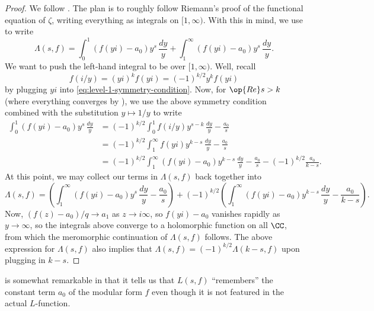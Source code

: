 \documentclass{amsart}
\begin{document}
\begin{proof}
	We follow \cite[Theorem~9.5]{conrad-forms}. The plan is to roughly follow Riemann's proof of the functional equation of $\zeta$, writing everything as integrals on $[1,\infty)$. With this in mind, we use  to write
	\[\Lambda(s,f)=\int_0^1(f(yi)-a_0)y^s\,\frac{dy}y+\int_1^\infty(f(yi)-a_0)y^s\,\frac{dy}y.\]
	We want to push the left-hand integral to be over $[1,\infty)$. Well, recall
	\[f(i/y)=(yi)^kf(yi)=(-1)^{k/2}y^kf(yi)\]
	by plugging $yi$ into \eqref{eq:level-1-symmetry-condition}. Now, for $\op{Re}s>k$ (where everything converges by ), we use the above symmetry condition combined with the substitution $y\mapsto1/y$ to write
	\begin{align*}
		\int_0^1(f(yi)-a_0)y^s\,\frac{dy}y &= (-1)^{k/2}\int_0^1f(i/y)y^{s-k}\,\frac{dy}y-\frac{a_0}s \\
		&= (-1)^{k/2}\int_1^\infty f(yi)y^{k-s}\,\frac{dy}y-\frac{a_0}s \\
		&= (-1)^{k/2}\int_1^\infty(f(yi)-a_0)y^{k-s}\,\frac{dy}y-\frac{a_0}s-(-1)^{k/2}\frac{a_0}{k-s}.
	\end{align*}
	At this point, we may collect our terms in $\Lambda(s,f)$ back together into
	\[\Lambda(s,f)=\left(\int_1^\infty(f(yi)-a_0)y^s\,\frac{dy}y-\frac{a_0}s\right)+(-1)^{k/2}\left(\int_1^\infty(f(yi)-a_0)y^{k-s}\,\frac{dy}y-\frac{a_0}{k-s}\right).\]
	Now, $(f(z)-a_0)/q\to a_1$ as $z\to i\infty$, so $f(yi)-a_0$ vanishes rapidly as $y\to\infty$, so the integrals above converge to a holomorphic function on all $\CC$, from which the meromorphic continuation of $\Lambda(s,f)$ follows. The above expression for $\Lambda(s,f)$ also implies that $\Lambda(s,f)=(-1)^{k/2}\Lambda(k-s,f)$ upon plugging in $k-s$.
\end{proof}
\begin{remark}
	 is somewhat remarkable in that it tells us that $L(s,f)$ ``remembers'' the constant term $a_0$ of the modular form $f$ even though it is not featured in the actual $L$-function.
\end{remark}
\end{document}
